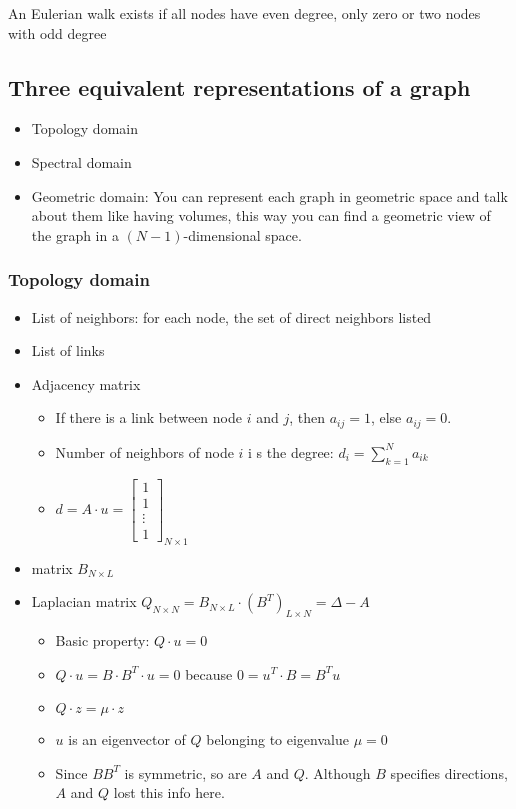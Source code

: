 An Eulerian walk exists if all nodes have even degree, only zero or two nodes with odd degree

\subsection{Three equivalent representations of a graph}

\begin{itemize}
  \item Topology domain
  \item Spectral domain
  \item Geometric domain: You can represent each graph in geometric space and talk about
  them like having volumes, this way you can find a geometric view of the graph in a 
  $(N-1)$-dimensional space.
  
\end{itemize}

\subsubsection{Topology domain}

\begin{itemize}
  \item List of neighbors: for each node, the set of direct neighbors listed
  \item List of links
  \item Adjacency matrix
  \begin{itemize}
    \item If there is a link between node $i$ and $j$, then $a_{ij} = 1$, else $a_{ij} = 0$.
    \item Number of neighbors of node $i$ i s the degree: $d_i = \sum_{k = 1}^{N} a_{ik}$
    \item
    $
    d = A \cdot u =
    \begin{bmatrix}
      1 \\ 1 \\ \vdots \\ 1
    \end{bmatrix}_{N \times 1}
    $
  \end{itemize}
  \item matrix $B_{N \times L}$
  \item Laplacian matrix $Q_{N \times N} = B_{N \times L} \cdot (B^T)_{L \times N} = \Delta - A$
  \begin{itemize}
    \item Basic property: $Q \cdot u = 0$
    \item $Q \cdot u = B \cdot B^T \cdot u = 0$ because $0 = u^T \cdot B = B^T u$
    \item $Q \cdot z = \mu \cdot z$
    \item $u$ is an eigenvector of $Q$ belonging to eigenvalue $\mu = 0$
    \item Since $BB^T$ is symmetric, so are $A$ and $Q$. Although $B$ specifies directions,
    $A$ and $Q$ lost this info here.
  \end{itemize}
\end{itemize}

